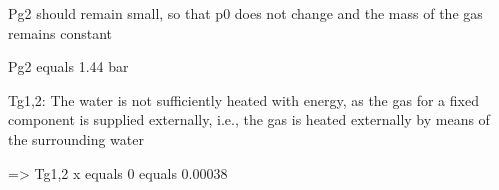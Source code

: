 Pg2 should remain small, so that p0 does not change and the mass of the gas remains constant

Pg2 equals 1.44 bar

Tg1,2: The water is not sufficiently heated with energy, as the gas for a fixed component is supplied externally, i.e., the gas is heated externally by means of the surrounding water

=> Tg1,2 x equals 0 equals 0.00038